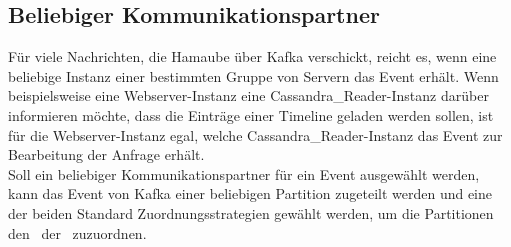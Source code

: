 \subsection{Beliebiger Kommunikationspartner}
Für viele Nachrichten, die Hamaube über Kafka verschickt, reicht es, wenn eine beliebige Instanz einer bestimmten Gruppe von Servern das Event erhält. Wenn beispielsweise eine Webserver-Instanz eine Cassandra\_Reader-Instanz darüber informieren möchte, dass die Einträge einer Timeline geladen werden sollen, ist für die Webserver-Instanz egal, welche Cassandra\_Reader-Instanz das Event zur Bearbeitung der Anfrage erhält.\\
Soll ein beliebiger Kommunikationspartner für ein Event ausgewählt werden, kann das Event von Kafka einer beliebigen Partition zugeteilt werden und eine der beiden Standard Zuordnungsstrategien gewählt werden, um die Partitionen den \Cn\ der \CG\ zuzuordnen.
